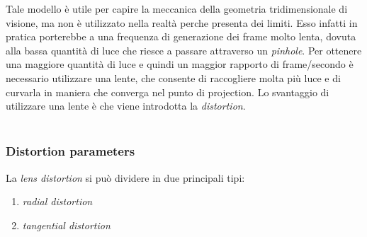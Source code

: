 Tale modello è utile per capire la meccanica della geometria tridimensionale di visione, ma non è utilizzato nella realtà perche presenta dei limiti. Esso infatti in pratica porterebbe a una frequenza di generazione dei frame molto lenta, dovuta alla bassa quantità di luce che riesce a passare attraverso un \textit{pinhole}. Per ottenere una maggiore quantità di luce e quindi un maggior rapporto di frame/secondo è necessario utilizzare una lente, che consente di raccogliere molta più luce e di curvarla in maniera che converga nel punto di projection. Lo svantaggio di utilizzare una lente è che viene introdotta la \textit{distortion}. \\ \\

\subsubsection{Distortion parameters}

La \textit{lens distortion} si può dividere in due principali tipi:
\begin{enumerate}
	\item \textit{radial distortion}
	\item \textit{tangential distortion}
\end{enumerate}

